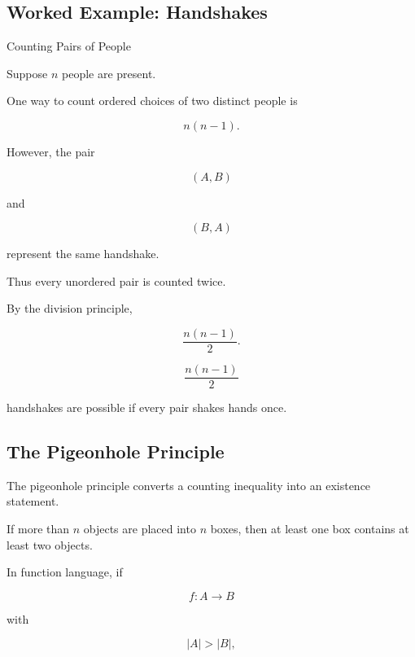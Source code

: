 \subsection{Worked Example: Handshakes}
\label{subsec:worked-handshakes}

\begin{workedexamplebox}{Counting Pairs of People}

Suppose \(n\) people are present.

One way to count ordered choices of two distinct people is

\[
n(n-1).
\]

However, the pair

\[
(A,B)
\]

and

\[
(B,A)
\]

represent the same handshake.

Thus every unordered pair is counted twice.

By the division principle,

\[
\frac{n(n-1)}{2}.
\]

\begin{answerbox}
\[
\boxed{
\frac{n(n-1)}{2}
}
\]

handshakes are possible if every pair shakes hands once.
\end{answerbox}

\end{workedexamplebox}

\subsection{The Pigeonhole Principle}
\label{subsec:pigeonhole-principle}

The pigeonhole principle converts a counting inequality into an
existence statement.

\begin{theorem}
If more than \(n\) objects are placed into \(n\) boxes, then at least
one box contains at least two objects.
\end{theorem}

In function language, if

\[
f:A\to B
\]

with

\[
|A|>|B|,
\]

